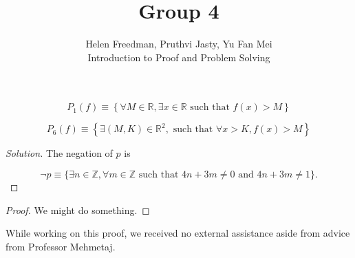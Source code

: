 \documentclass[12pt]{article}
\newenvironment{problem}[2][Problem]{\begin{trivlist}
\item[\hskip \labelsep {\bfseries #1}\hskip \labelsep {\bfseries #2.}]}{\end{trivlist}}
\newenvironment{solution}
               {\let\oldqedsymbol=\qedsymbol
                \renewcommand{\qedsymbol}{$\blacktriangleleft$}
                \begin{proof}[\textit\upshape Solution]}
               {\end{proof}
                \renewcommand{\qedsymbol}{\oldqedsymbol}}
\begin{document}

\title{Group 4}%
\author{Helen Freedman, Pruthvi Jasty, Yu Fan Mei\\ %
	Introduction to Proof and Problem Solving} %
\maketitle

\begin{problem}{4a} %

    $$P_1 \left(f\right) \equiv \left\{ \forall M \in \mathbb{R}, \exists x \in \mathbb{R} \text{ such that } f(x) > M \right\}$$

    $$P_6 \left(f\right) \equiv \left\{ \exists (M, K) \in \mathbb{R}^2, \text{ such that } \forall x > K, f(x) > M \right\}$$

\end{problem}

\begin{solution} The negation of $p$ is

	$$ \lnot p \equiv \{ \exists n \in \mathbb{Z}, \forall m \in \mathbb{Z} \text{ such that } 4n + 3m \neq 0 \text{ and } 4n + 3m \neq 1 \}. $$


\end{solution}


\begin{proof} We might do something.



\end{proof}


\noindent While working on this proof, we received no external assistance aside from advice from Professor Mehmetaj.
\end{document}
